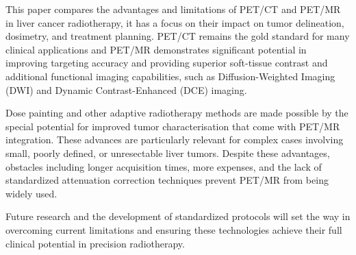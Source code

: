 This paper compares the advantages and limitations of PET/CT and PET/MR in liver cancer radiotherapy, it has a focus on their impact on tumor delineation, dosimetry, and treatment planning. PET/CT remains the gold standard for many clinical applications and PET/MR demonstrates significant potential in improving targeting accuracy and providing superior soft-tissue contrast and additional functional imaging capabilities, such as Diffusion-Weighted Imaging (DWI) and Dynamic Contrast-Enhanced (DCE) imaging.

Dose painting and other adaptive radiotherapy methods are made possible by the special potential for improved tumor characterisation that come with PET/MR integration. These advances are particularly relevant for complex cases involving small, poorly defined, or unresectable liver tumors. Despite these advantages, obstacles including longer acquisition times, more expenses, and the lack of standardized attenuation correction techniques prevent PET/MR from being widely used.


Future research and the development of standardized protocols will set the way in overcoming current limitations and ensuring these technologies achieve their full clinical potential in precision radiotherapy.